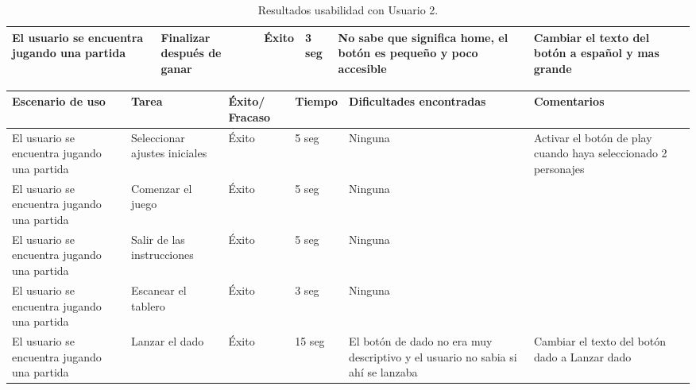 \begin{table}
\begin{center}
\begin{tabular}{|p{2.5cm}|p{1.75cm}|p{1.25cm}|p{1.25cm}|p{2.75cm}|p{3.5cm}|}
      \hline
      El usuario se encuentra jugando una partida
      & Finalizar después de ganar
      & Éxito
      & 3 seg
      & No sabe que significa home, el botón es pequeño y poco accesible
      & Cambiar el texto del botón a español y mas grande\\

      \hline

    \end{tabular}

    \caption{Resultados usabilidad con Usuario 2.}
    \label{tabla-bocetos-usuario2}

  \end{center}
\end{table}


\begin{table}
  \begin{center}
    \begin{tabular}{|p{2.5cm}|p{1.75cm}|p{1.25cm}|p{1.25cm}|p{2.75cm}|p{3.5cm}|}

      \hline
        \rowcolor{Gray} \textbf{Escenario de uso}
        & \textbf{Tarea}
        & \textbf{Éxito/ Fracaso}
        & \textbf{Tiempo}
        & \textbf{Dificultades encontradas}
        & \textbf{Comentarios}\\

      \hline
      El usuario se encuentra jugando una partida
      & Seleccionar ajustes iniciales
      & Éxito
      & 5 seg
      & Ninguna
      & Activar el botón de play cuando haya seleccionado 2 personajes\\

      \hline
      El usuario se encuentra jugando una partida
      & Comenzar el juego
      & Éxito
      & 5 seg
      & Ninguna
      &\\

      \hline
      El usuario se encuentra jugando una partida
      & Salir de las instrucciones
      & Éxito
      & 5 seg
      & Ninguna
      &\\

      \hline
      El usuario se encuentra jugando una partida
      & Escanear el tablero
      & Éxito
      & 3 seg
      & Ninguna
      &\\

      \hline
      El usuario se encuentra jugando una partida
      & Lanzar el dado
      & Éxito
      & 15 seg
      & El botón de dado no era muy descriptivo y el usuario no sabia si ahí se lanzaba
      & Cambiar el texto del botón dado a Lanzar dado\\


\end{tabular}
\end{center}
\end{table}
